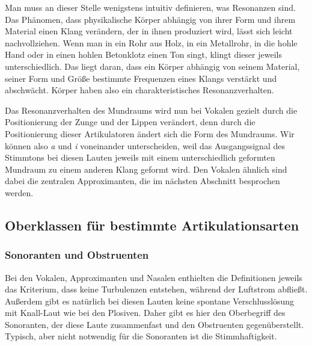 

Man muss an dieser Stelle wenigstens intuitiv definieren, was Resonanzen sind.
Das Phänomen, dass physikalische Körper abhängig von ihrer Form und ihrem Material einen Klang verändern, der in ihnen produziert wird, lässt sich leicht nachvollziehen.
Wenn man in ein Rohr aus Holz, in ein Metallrohr, in die hohle Hand oder in einen hohlen Betonklotz einen Ton singt, klingt dieser jeweils unterschiedlich.
Das liegt daran, dass ein Körper abhängig von seinem Material, seiner Form und Größe bestimmte Frequenzen eines Klangs verstärkt und abschwächt.
Körper haben also ein charakteristisches Resonanzverhalten.

Das Resonanzverhalten des Mundraums wird nun bei Vokalen gezielt durch die Positionierung der Zunge und der Lippen verändert, denn durch die Positionierung dieser Artikulatoren ändert sich die Form des Mundraums.
Wir können also \textit{a} und \textit{i} voneinander unterscheiden, weil das Ausgangssignal des Stimmtons bei diesen Lauten jeweils mit einem unterschiedlich geformten Mundraum zu einem anderen Klang geformt wird.
Den Vokalen ähnlich sind dabei die zentralen Approximanten, die im nächsten Abschnitt besprochen werden.

\subsection{Oberklassen für bestimmte Artikulationsarten}

\subsubsection{Sonoranten und Obstruenten}

Bei den Vokalen, Approximanten und Nasalen enthielten die Definitionen jeweils das Kriterium, dass keine Turbulenzen entstehen, während der Luftstrom abfließt.
Außerdem gibt es natürlich bei diesen Lauten keine spontane Verschlusslösung mit Knall-Laut wie bei den Plosiven.
Daher gibt es hier den Oberbegriff des Sonoranten, der diese Laute zusammenfast und den Obstruenten gegenüberstellt.
Typisch, aber nicht notwendig für die Sonoranten ist die Stimmhaftigkeit.


